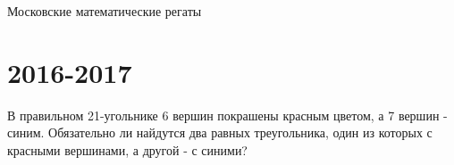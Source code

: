 \documentclass[11pt, a4paper]{problems_template}
\begin{document}
\begin{titlepage}
  \begin{center}
	\Huge{Московские математические регаты}
  \end{center}
\end{titlepage} 


\chapter{2016-2017}

\begin{exercise}
В правильном 21-угольнике 6 вершин покрашены красным цветом, а 7 вершин - синим. Обязательно ли найдутся два равных треугольника, один из которых с красными вершинами, а другой - с синими?
\end{exercise}
\end{document}
